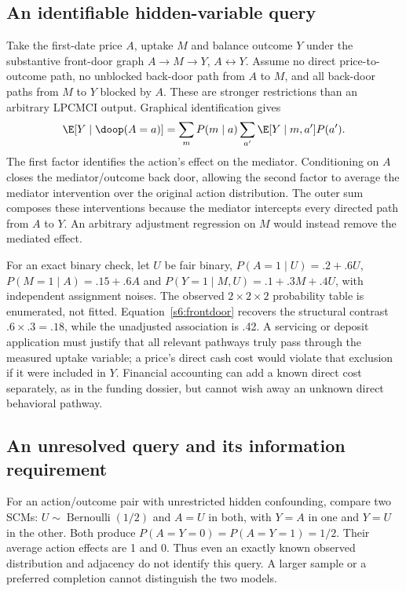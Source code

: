 \subsection{An identifiable hidden-variable query}
Take the first-date price $A$, uptake $M$ and balance outcome $Y$ under the
substantive front-door graph $A\to M\to Y$, $A\leftrightarrow Y$.
Assume no direct price-to-outcome path, no unblocked back-door path from
$A$ to $M$, and all back-door paths from $M$ to $Y$ blocked by $A$.
These are stronger restrictions than an arbitrary LPCMCI output. Graphical
identification gives \citep{pearl2009,id2006}
\begin{equation}
 \E[Y\mid\doop(A=a)]
 =\sum_mP(m\mid a)\sum_{a'}\E[Y\mid m,a']P(a').
 \label{s6:frontdoor}
\end{equation}
The first factor identifies the action's effect on the mediator. Conditioning
on $A$ closes the mediator/outcome back door, allowing the second factor to
average the mediator intervention over the original action distribution.
The outer sum composes these interventions because the mediator intercepts
every directed path from $A$ to $Y$. An arbitrary adjustment regression on
$M$ would instead remove the mediated effect.

For an exact binary check, let $U$ be fair binary,
$P(A=1\mid U)=.2+.6U$, $P(M=1\mid A)=.15+.6A$ and
$P(Y=1\mid M,U)=.1+.3M+.4U$, with independent assignment noises.
The observed $2\times2\times2$ probability table is enumerated, not fitted.
Equation~\eqref{s6:frontdoor} recovers the structural contrast
$.6\times.3=.18$, while the unadjusted association is .42. A servicing or
deposit application must justify that all relevant pathways truly pass
through the measured uptake variable; a price's direct cash cost would
violate that exclusion if it were included in $Y$. Financial accounting can
add a known direct cost separately, as in the funding dossier, but cannot
wish away an unknown direct behavioral pathway.

\subsection{An unresolved query and its information requirement}
For an action/outcome pair with unrestricted hidden confounding, compare
two SCMs: $U\sim\operatorname{Bernoulli}(1/2)$ and $A=U$ in both,
with $Y=A$ in one and $Y=U$ in the other. Both produce
$P(A=Y=0)=P(A=Y=1)=1/2$. Their average action effects are 1 and 0.
Thus even an exactly known observed distribution and adjacency do not
identify this query. A larger sample or a preferred completion cannot
distinguish the two models.

